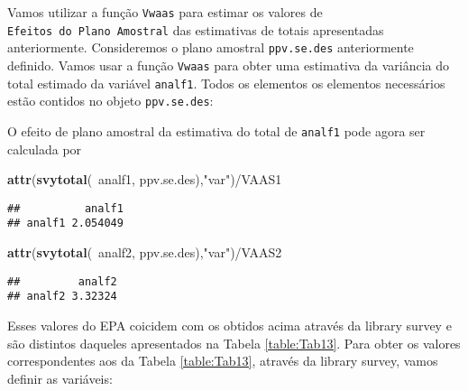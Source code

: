 \documentclass[]{book}
\newenvironment{Shaded}{\begin{snugshade}}{\end{snugshade}}
\newcommand{\KeywordTok}[1]{\textcolor[rgb]{0.13,0.29,0.53}{\textbf{{#1}}}}
\newcommand{\StringTok}[1]{\textcolor[rgb]{0.31,0.60,0.02}{{#1}}}
\newcommand{\NormalTok}[1]{{#1}}
\numberwithin{example}{chapter}
\numberwithin{remark}{chapter}
\numberwithin{definition}{chapter}
\begin{document}
Vamos utilizar a função \texttt{Vwaas} para estimar os valores de
\texttt{Efeitos\ do\ Plano\ Amostral} das estimativas de totais
apresentadas anteriormente. Consideremos o plano amostral
\texttt{ppv.se.des} anteriormente definido. Vamos usar a função
\texttt{Vwaas} para obter uma estimativa da variância do total estimado
da variável \texttt{analf1}. Todos os elementos os elementos necessários
estão contidos no objeto \texttt{ppv.se.des}:

\begin{Shaded}
\end{Shaded}

O efeito de plano amostral da estimativa do total de \texttt{analf1}
pode agora ser calculada por

\begin{Shaded}
\begin{Highlighting}[]
\KeywordTok{attr}\NormalTok{(}\KeywordTok{svytotal}\NormalTok{(~analf1, ppv.se.des),}\StringTok{"var"}\NormalTok{)/VAAS1}
\end{Highlighting}
\end{Shaded}

\begin{verbatim}
##          analf1
## analf1 2.054049
\end{verbatim}

\begin{Shaded}
\begin{Highlighting}[]
\KeywordTok{attr}\NormalTok{(}\KeywordTok{svytotal}\NormalTok{(~analf2, ppv.se.des),}\StringTok{"var"}\NormalTok{)/VAAS2}
\end{Highlighting}
\end{Shaded}

\begin{verbatim}
##         analf2
## analf2 3.32324
\end{verbatim}

Esses valores do EPA coicidem com os obtidos acima através da library
survey e são distintos daqueles apresentados na Tabela
\ref{table:Tab13}. Para obter os valores correspondentes aos da Tabela
\ref{table:Tab13}, através da library survey, vamos definir as
variáveis:
\end{document}
